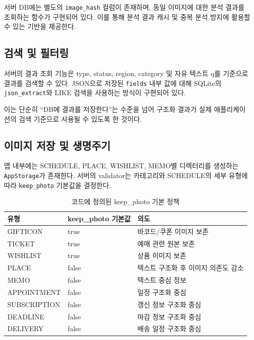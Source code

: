\documentclass[11pt,a4paper]{article}
\begin{document}
서버 DB에는 별도의 \texttt{image\_hash} 컬럼이 존재하며, 동일 이미지에 대한 분석 결과를 조회하는 함수가 구현되어 있다. 이를 통해 분석 결과 캐시 및 중복 분석 방지에 활용할 수 있는 기반을 제공한다.

\subsection{검색 및 필터링}

서버의 결과 조회 기능은 type, status, region, category 및 자유 텍스트 q를 기준으로 결과를 검색할 수 있다. JSON으로 저장된 \texttt{fields} 내부 값에 대해 SQLite의 \texttt{json\_extract}와 LIKE 검색을 사용하는 방식이 구현되어 있다.

이는 단순히 ``DB에 결과를 저장한다''는 수준을 넘어 구조화 결과가 실제 애플리케이션의 검색 기준으로 사용될 수 있도록 한 것이다.

\subsection{이미지 저장 및 생명주기}

앱 내부에는 SCHEDULE, PLACE, WISHLIST, MEMO별 디렉터리를 생성하는 \texttt{AppStorage}가 존재한다. 서버의 validator는 카테고리와 SCHEDULE의 세부 유형에 따라 \texttt{keep\_photo} 기본값을 결정한다.

\begin{table}[H]
\centering
\small
\begin{tabularx}{0.9\linewidth}{l l l}
\toprule
\textbf{유형} & \textbf{keep\_photo 기본값} & \textbf{의도}\\
\midrule
GIFTICON & true & 바코드/쿠폰 이미지 보존\\
TICKET & true & 예매 관련 원본 보존\\
WISHLIST & true & 상품 이미지 보존\\
PLACE & false & 텍스트 구조화 후 이미지 의존도 감소\\
MEMO & false & 텍스트 중심 정보\\
APPOINTMENT & false & 일정 구조화 중심\\
SUBSCRIPTION & false & 갱신 정보 구조화 중심\\
DEADLINE & false & 마감 정보 구조화 중심\\
DELIVERY & false & 배송 일정 구조화 중심\\
\bottomrule
\end{tabularx}
\caption{코드에 정의된 keep\_photo 기본 정책}
\end{table}
\end{document}
